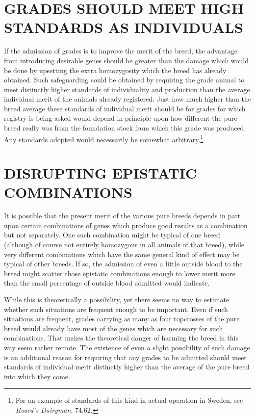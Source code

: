 \section*{GRADES SHOULD MEET HIGH STANDARDS AS INDIVIDUALS}

If the admission of grades is to improve the merit of the breed, the
advantage from introducing desirable genes should be greater than the
damage which would be done by upsetting the extra homozygosity
which the breed has already obtained. Such safeguarding could be
obtained by requiring the grade animal to meet distinctly higher standards
of individuality and production than the average individual merit
of the animals already registered. Just how much higher than the
breed average these standards of individual merit should be for grades
for which registry is being asked would depend in principle upon how
different the pure breed really was from the foundation stock from
which this grade was produced. Any standards adopted would necessarily
be somewhat arbitrary.\footnote{For an example of standards of this kind in
actual operation in Sweden, see \textit{Hoard's Dairyman}, 74:62.}

\section*{DISRUPTING EPISTATIC COMBINATIONS}

It is possible that the present merit of the various pure breeds
depends in part upon certain combinations of genes which produce
good results as a combination but not separately. One such combination
might be typical of one breed (although of course not entirely homozygous
in all animals of that breed), while very different combinations
which have the same general kind of effect may be typical of other
breeds. If so, the admission of even a little outside blood to the breed
might scatter those epistatic combinations enough to lower merit more
than the small percentage of outside blood admitted would indicate.

While this is theoretically a possibility, yet there seems no way to
estimate whether such situations are frequent enough to be important.
Even if such situations are frequent, grades carrying as many as four
topcrosses of the pure breed would already have most of the genes
which are necessary for such combinations. That makes the theoretical
danger of harming the breed in this way seem rather remote. The existence
of even a slight possibility of such damage is an additional reason
for requiring that any grades to be admitted should meet standards of
individual merit distinctly higher than the average of the pure breed
into which they come.

